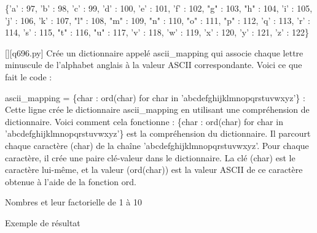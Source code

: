 \{'a' : 97, 'b' : 98, 'c' : 99, 'd' : 100, 'e' : 101, 'f' : 102, "g" : 103, "h" : 104, 'i' : 105, 'j' : 106, 'k' : 107, "l" : 108, "m" : 109, "n" : 110, "o" : 111, "p" : 112, 'q' : 113, 'r' : 114, 's' : 115, "t" : 116, "u" : 117, 'v' : 118, 'w' : 119, 'x' : 120, 'y' : 121, 'z' : 122\}
        \par
        \begin{solution}
            \renewcommand{\nomfichier}{q696.py}
            \pythonfile{\chemincode \nomfichier}[][\nomfichier]
            Crée un dictionnaire appelé ascii\_mapping qui associe chaque lettre minuscule de l'alphabet anglais à la valeur ASCII correspondante. Voici ce que fait le code :

    ascii\_mapping = \{char : ord(char) for char in 'abcdefghijklmnopqrstuvwxyz'\} : Cette ligne crée le dictionnaire ascii\_mapping en utilisant une compréhension de dictionnaire. Voici comment cela fonctionne :
        \{char : ord(char) for char in 'abcdefghijklmnopqrstuvwxyz'\} est la compréhension du dictionnaire. Il parcourt chaque caractère (char) de la chaîne 'abcdefghijklmnopqrstuvwxyz'.
        Pour chaque caractère, il crée une paire clé-valeur dans le dictionnaire. La clé (char) est le caractère lui-même, et la valeur (ord(char)) est la valeur ASCII de ce caractère obtenue à l'aide de la fonction ord.
        \end{solution}
        

        \question
        Nombres et leur factorielle de 1 à 10

Exemple de résultat

